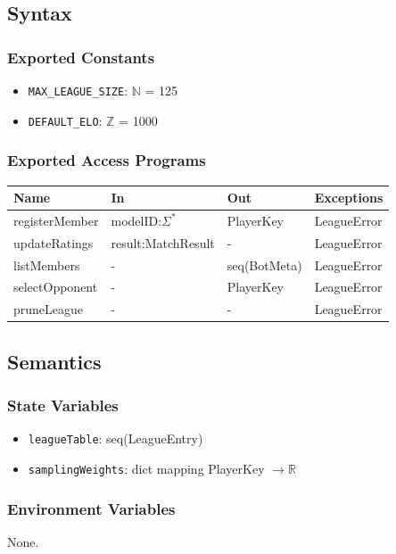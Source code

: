 \documentclass[12pt, titlepage]{article}
\begin{document}
\subsection{Syntax}

\subsubsection{Exported Constants}
\begin{itemize}
\item \texttt{MAX\_LEAGUE\_SIZE}: $\mathbb{N}$ = 125
\item \texttt{DEFAULT\_ELO}: $\mathbb{Z}$ = 1000
\end{itemize}

\subsubsection{Exported Access Programs}
\begin{center}
\begin{tabular}{p{5cm} p{4cm} p{4cm} p{3cm}}
\hline
\textbf{Name} & \textbf{In} & \textbf{Out} & \textbf{Exceptions} \\
\hline
registerMember & modelID:$\Sigma^*$ & PlayerKey & LeagueError \\
updateRatings & result:MatchResult & - & LeagueError \\
listMembers & - & seq(BotMeta) & LeagueError \\
selectOpponent & - & PlayerKey & LeagueError \\
pruneLeague & - & - & LeagueError \\
\hline
\end{tabular}
\end{center}

\subsection{Semantics}

\subsubsection{State Variables}
\begin{itemize}
\item \texttt{leagueTable}: seq(LeagueEntry)
\item \texttt{samplingWeights}: dict mapping PlayerKey $\rightarrow \mathbb{R}$
\end{itemize}

\subsubsection{Environment Variables}
None.
\end{document}
